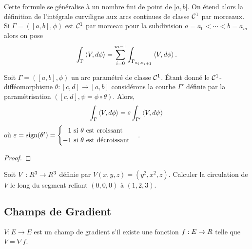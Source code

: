 Cette formule se généralise à un nombre fini de point de $]a,b[$. On étend alors la définition de l'intégrale curviligne aux arcs continues de classe $\mathcal{C}^1$ par morceaux. Si $\Gamma=([a,b],\phi)$ est $\mathcal{C}^1$ par morceau pour la subdivision $a=a_0 < \cdots< b=a_m $ alors on pose 
\[
	\int_{\Gamma} \left\langle V,d\phi\right\rangle = \sum_{i=0}^{m-1} \int_{\Gamma_{a_{i},a_{i+1}}} \left\langle V,d\phi\right\rangle.
\]


\begin{proposition}
	Soit $\Gamma=([a,b],\phi)$ un arc paramétré de classe $\mathcal{C}^1$. \'Etant donné le $\mathcal{C}^1$-difféomorphisme $\theta: [c,d] \to [a,b]$ considérons la courbe $\Gamma'$ définie par la paramétrisation $([c,d] , \psi = \phi \circ \theta)$. Alors,
	\[
		\int_{\Gamma} \left\langle V,d\phi\right\rangle= \varepsilon \int_{\Gamma'} \left\langle V,d\psi\right\rangle
	\]
	où $\varepsilon = \operatorname{sign}(\theta')=  \begin{cases} \hphantom{-}1  \text{ si  $\theta$ est croissant}\\ -1 \text{ si  $\theta$ est décroissant} \end{cases}$. 
\end{proposition}

\begin{proof}
	\pl{\rep{5cm}}
\end{proof}

\begin{exemple}
	Soit $V:R^3\to R^3$ définie par $V(x,y,z) = (y^2,x^2,z)$. Calculer la circulation de $V$ le long du segment reliant $(0,0,0)$ à $(1,2,3)$.
	\pl{\rep{5cm}}
\end{exemple}

\subsection{Champs de Gradient}

\begin{definition}
	$V:E\to E$ est un champ de gradient  s'il existe une fonction $f:E \to R$ telle que $V= \nabla f$.  
\end{definition}

